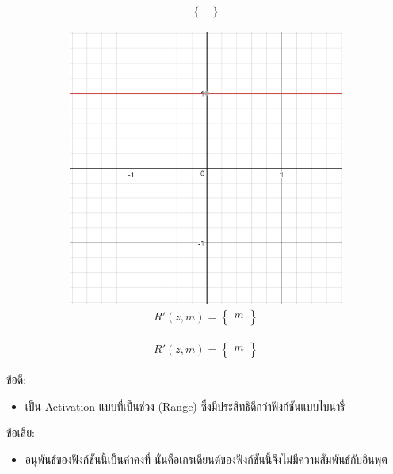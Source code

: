\begin{itemize}
\begin{figure}[htbp]
\begin{subfigure}{0.5\textwidth}
{\begin{equation}
\begin{split}
\begin{Bmatrix}
                    \end{Bmatrix}\end{split}
                \end{equation}
            }
            \label{fig:actfunc_lin}
        \end{subfigure}%
        \begin{subfigure}{0.5\textwidth}
            \centering
            \includegraphics[width=0.9\linewidth]{fig/actfunc_linear_der.png}
            \caption{%
                \begin{equation}
                    \begin{split}R'(z,m) = \begin{Bmatrix} m \\
                    \end{Bmatrix}\end{split}
                \end{equation}
            }
            \label{fig:actfunc_lin_der}
        \end{subfigure}
    \end{figure}
    ข้อดี:
    \begin{itemize}
        \item เป็น Activation แบบที่เป็นช่วง (Range) ซึ่งมีประสิทธิดีกว่าฟังก์ชันแบบไบนารี่
    \end{itemize}
    ข้อเสีย:
    \begin{itemize}
        \item อนุพันธ์ของฟังก์ชันนี้เป็นค่าคงที่ นั่นคือเกรเดียนต์ของฟังก์ชันนี้จึงไม่มีความสัมพันธ์กับอินพุต
    \end{itemize}


\end{itemize}
